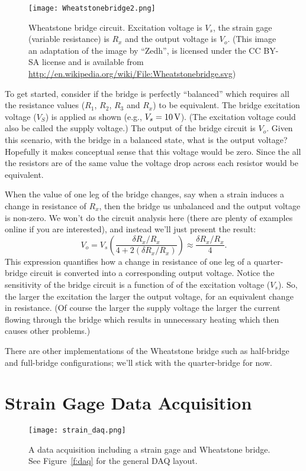 \begin{figure}[hbt!]
\centerline{
{\texttt{[image: Wheatstonebridge2.png]}}}
\caption{ Wheatstone bridge circuit.  Excitation voltage is $V_s$, the strain gage (variable resistance) is $R_x$ and the output voltage is $V_o$. (This image an adaptation of the image by ``Zedh'', is licensed under the CC BY-SA license and is available from \url{http://en.wikipedia.org/wiki/File:Wheatstonebridge.svg}) }
\label{f:bridge}
\end{figure}

To get started, consider if the bridge is perfectly ``balanced'' which requires all the resistance values ($R_1$, $R_2$, $R_3$ and $R_x$) to be equivalent.  The \gls{bridge excitation voltage} ($V_S$) is applied as shown (e.g., $V_s=\unit[10]{V}$).  (The excitation voltage could also be called the supply voltage.) The output of the bridge circuit is $V_o$.  Given this scenario, with the bridge in a balanced state, what is the output voltage?  Hopefully it makes conceptual sense that this voltage would be zero.  Since the all the resistors are of the same value the voltage drop across each resistor would be equivalent.

When the value of one leg of the bridge changes, say when a strain induces a change in resistance of $R_x$, then the bridge us unbalanced and the output voltage is non-zero.  We won't do the circuit analysis here (there are plenty of examples online if you are interested), and instead we'll just present the result:
\begin{equation}\label{e:bridge}
V_o = V_s \left( \frac{\delta R_x/R_x}{4+2(\delta R_x/R_x)} \right) \approx \frac{\delta R_x/R_x}{4}.
\end{equation}
This expression quantifies how a change in resistance of one leg of a quarter-bridge circuit is converted into a corresponding output voltage.  Notice the sensitivity of the bridge circuit is a function of of the excitation voltage ($V_s$).  So, the larger the excitation the larger the output voltage, for an equivalent change in resistance.  (Of course the larger the supply voltage the larger the current flowing through the bridge which results in unnecessary heating which then causes other problems.)

There are other implementations of the Wheatstone bridge such as half-bridge and full-bridge configurations; we'll stick with the quarter-bridge for now.

\section{Strain Gage Data Acquisition}
\begin{figure}[hbt!]
\centering
\texttt{[image: strain\_daq.png]}
\caption{A data acquisition including a strain gage and Wheatstone bridge.  See Figure~\ref{f:daq} for the general DAQ layout.}
\label{f:straindaq}
\end{figure}

